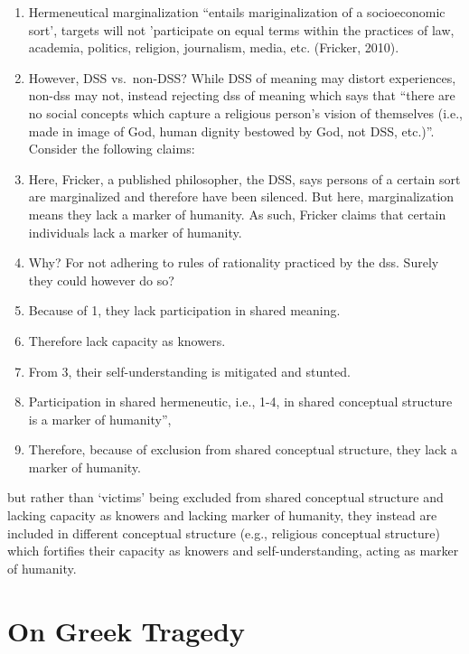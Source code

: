 \documentclass[
  letterpaper,
  DIV=11,
  numbers=noendperiod]{scrreprt}
\providecommand{\tightlist}{%
  \setlength{\itemsep}{0pt}\setlength{\parskip}{0pt}}\usepackage{longtable,booktabs,array}
\begin{document}
\begin{tcolorbox}[enhanced jigsaw, arc=.35mm, breakable, rightrule=.15mm, colback=white, colframe=quarto-callout-important-color-frame, bottomrule=.15mm, leftrule=.75mm, opacityback=0, toprule=.15mm, left=2mm]
\begin{tcolorbox}[enhanced jigsaw, arc=.35mm, breakable, rightrule=.15mm, colback=white, colframe=quarto-callout-tip-color-frame, bottomrule=.15mm, leftrule=.75mm, opacityback=0, toprule=.15mm, left=2mm]
\begin{enumerate}
  \begin{enumerate}
  \def\labelenumii{\arabic{enumii}.}
  \tightlist
  \item
    Hermeneutical marginalization ``entails mariginalization of a
    socioeconomic sort', targets will not 'participate on equal terms
    within the practices of law, academia, politics, religion,
    journalism, media, etc. (Fricker, 2010).
  \item
    However, DSS vs.~non-DSS? While DSS of meaning may distort
    experiences, non-dss may not, instead rejecting dss of meaning which
    says that ``there are no social concepts which capture a religious
    person's vision of themselves (i.e., made in image of God, human
    dignity bestowed by God, not DSS, etc.)''. Consider the following
    claims:
  \item
    Here, Fricker, a published philosopher, the DSS, says persons of a
    certain sort are marginalized and therefore have been silenced. But
    here, marginalization means they lack a marker of humanity. As such,
    Fricker claims that certain individuals lack a marker of humanity.
  \item
    Why? For not adhering to rules of rationality practiced by the dss.
    Surely they could however do so?
  \item
    Because of 1, they lack participation in shared meaning.
  \item
    Therefore lack capacity as knowers.
  \item
    From 3, their self-understanding is mitigated and stunted.
  \item
    Participation in shared hermeneutic, i.e., 1-4, in shared conceptual
    structure is a marker of humanity'',
  \item
    Therefore, because of exclusion from shared conceptual structure,
    they lack a marker of humanity.
  \end{enumerate}
\end{enumerate}

but rather than `victims' being excluded from shared conceptual
structure and lacking capacity as knowers and lacking marker of
humanity, they instead are included in different conceptual structure
(e.g., religious conceptual structure) which fortifies their capacity as
knowers and self-understanding, acting as marker of humanity.

\chapter{On Greek Tragedy}\label{on-greek-tragedy}


\end{tcolorbox}
\end{tcolorbox}
\end{document}
